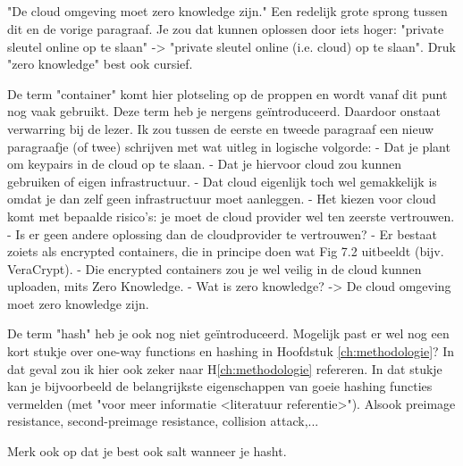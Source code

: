 \subsection{}
"De cloud omgeving moet zero knowledge zijn." Een redelijk grote sprong
tussen dit en de vorige paragraaf. Je zou dat kunnen oplossen door iets hoger:
"private sleutel online op te slaan" -> "private sleutel online (i.e. cloud) op
te slaan". Druk "zero knowledge" best ook cursief.

De term "container" komt hier plotseling op de proppen en wordt vanaf dit
punt nog vaak gebruikt. Deze term heb je nergens geïntroduceerd. Daardoor
onstaat verwarring bij de lezer. Ik zou tussen de eerste en tweede paragraaf
een nieuw paragraafje (of twee) schrijven met wat uitleg in logische volgorde:
- Dat je plant om keypairs in de cloud op te slaan.
- Dat je hiervoor cloud zou kunnen gebruiken of eigen infrastructuur.
- Dat cloud eigenlijk toch wel gemakkelijk is omdat je dan zelf geen
infrastructuur moet aanleggen.
- Het kiezen voor cloud komt met bepaalde risico's: je moet de cloud provider
wel ten zeerste vertrouwen.
- Is er geen andere oplossing dan de cloudprovider te vertrouwen?
- Er bestaat zoiets als encrypted containers, die in principe doen wat Fig 7.2
uitbeeldt (bijv. VeraCrypt).
- Die encrypted containers zou je wel veilig in de cloud kunnen uploaden, mits
Zero Knowledge.
- Wat is zero knowledge?
-> De cloud omgeving moet zero knowledge zijn.

De term "hash" heb je ook nog niet geïntroduceerd. Mogelijk past er wel nog
een kort stukje over one-way functions en hashing in Hoofdstuk
\ref{ch:methodologie}? In dat geval
zou ik hier ook zeker naar H\ref{ch:methodologie} refereren. In dat stukje kan
je bijvoorbeeld de
belangrijkste eigenschappen van goeie hashing functies vermelden (met "voor
meer informatie <literatuur referentie>"). Alsook preimage resistance,
second-preimage resistance, collision attack,...

Merk ook op dat je best ook salt wanneer je hasht.


